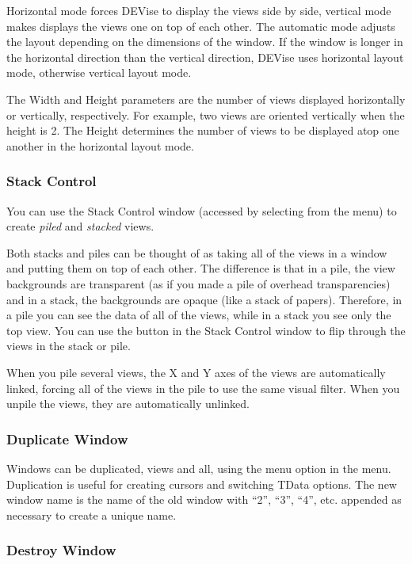 Horizontal mode forces DEVise to display the views side by side, vertical mode
makes displays the views one on top of each other. The automatic mode adjusts
the layout depending on the dimensions of the window. If the window is longer in
the horizontal direction than the vertical direction, DEVise uses
horizontal layout mode, otherwise vertical layout mode.

The Width and Height parameters are the number of views displayed horizontally
or vertically, respectively. For example, two views are oriented vertically when
the height is 2. The Height determines the number of views to be displayed atop
one another in the horizontal layout mode.

\subsubsection{Stack Control}

You can use the Stack Control window (accessed by selecting  from the  menu) to create {\em piled} and {\em stacked}
views.

Both stacks and piles can be thought of as taking all of the views in a window
and putting them on top of each other.  The difference is that in a pile,
the view backgrounds are transparent (as if you made a pile of overhead
transparencies) and in a stack, the backgrounds are opaque (like a stack
of papers).  Therefore, in a pile you can see the data of all of the views,
while in a stack you see only the top view.  You can use the 
button in the Stack Control window to flip through the views in the
stack or pile.

When you pile several views, the X and Y axes of the views are automatically
linked, forcing all of the views in the pile to use the same visual filter.
When you unpile the views, they are automatically unlinked.

\subsubsection{Duplicate Window}

Windows can be duplicated, views and all, using the  menu option
in the  menu. Duplication is useful for creating cursors and
switching TData options. The new window name is the name of the old window with
``2'', ``3'', ``4'', etc. appended as necessary to create a unique name.

\subsubsection{Destroy Window}

